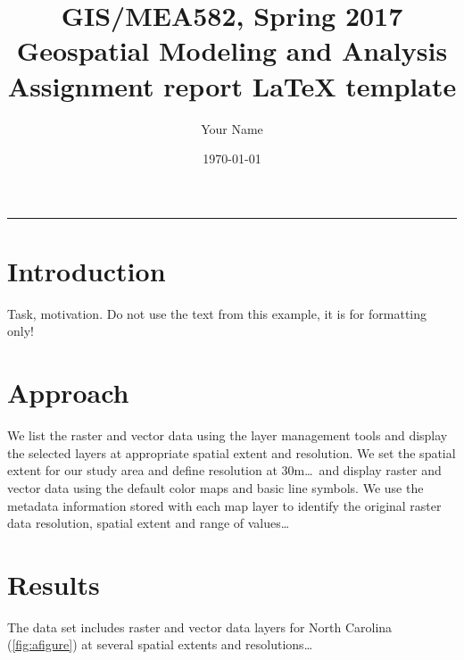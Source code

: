 \documentclass[10pt]{article}
\title{GIS/MEA582, Spring 2017 \\ Geospatial Modeling and Analysis \\ Assignment report \LaTeX{} template}
\author{Your Name}
\date{\today}
\begin{document}
\maketitle
\noindent
\rule{\textwidth}{1.5pt}

\pagestyle{fancy}


\section*{Introduction}

Task, motivation. Do not use the text from this example, it is for formatting only!

\section*{Approach}

We list the raster and vector data using the layer management tools and display
the selected layers at appropriate spatial extent and resolution.
We set the spatial extent for our study area and define resolution at 30m\ldots\ and
display raster and vector data using the default color maps and basic line symbols.
We use the metadata information stored with each map layer to identify
the original raster data resolution, spatial extent and range of values\ldots


\section*{Results}

The data set includes raster and vector data layers for North Carolina (\ref{fig:afigure})
at several spatial extents and resolutions\ldots
\end{document}
